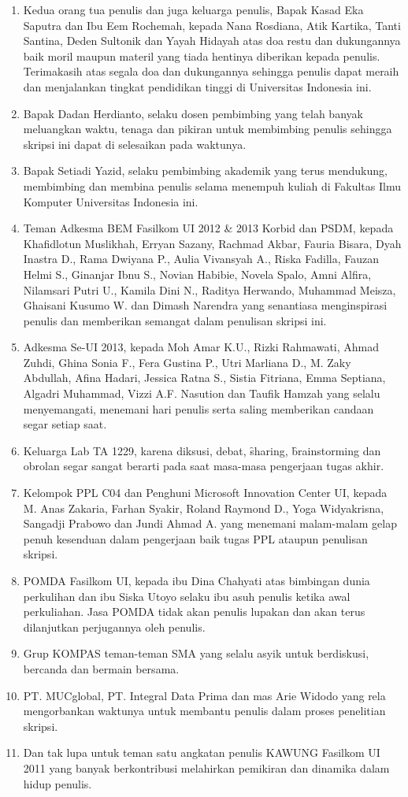 \begin{enumerate}
	\item Kedua orang tua penulis dan juga keluarga penulis, Bapak Kasad Eka Saputra dan Ibu Eem Rochemah, kepada Nana Rosdiana, Atik Kartika, Tanti Santina, Deden Sultonik dan Yayah Hidayah atas doa restu dan dukungannya baik moril maupun materil yang tiada hentinya diberikan kepada penulis. Terimakasih atas segala doa dan dukungannya sehingga penulis dapat meraih dan menjalankan tingkat pendidikan tinggi di Universitas Indonesia ini.
	\item Bapak Dadan Herdianto, selaku dosen pembimbing yang telah banyak meluangkan waktu, tenaga dan pikiran untuk membimbing penulis sehingga skripsi ini dapat di selesaikan pada waktunya.
	\item Bapak Setiadi Yazid, selaku pembimbing akademik yang terus mendukung, membimbing dan membina penulis selama menempuh kuliah di Fakultas Ilmu Komputer Universitas Indonesia ini.
	\item Teman Adkesma BEM Fasilkom UI 2012 \& 2013 Korbid dan PSDM, kepada Khafidlotun Muslikhah, Erryan Sazany, Rachmad Akbar, Fauria Bisara, Dyah Inastra D., Rama Dwiyana P., Aulia Vivansyah A., Riska Fadilla, Fauzan Helmi S., Ginanjar Ibnu S., Novian Habibie, Novela Spalo, Amni Alfira, Nilamsari Putri U., Kamila Dini N., Raditya Herwando, Muhammad Meisza, Ghaisani Kusumo W. dan Dimash Narendra yang senantiasa menginspirasi penulis dan memberikan semangat dalam penulisan skripsi ini.
	\item Adkesma Se-UI 2013, kepada Moh Amar K.U., Rizki Rahmawati, Ahmad Zuhdi, Ghina Sonia F., Fera Gustina P., Utri Marliana D., M. Zaky Abdullah, Afina Hadari, Jessica Ratna S., Sistia Fitriana, Emma Septiana, Algadri Muhammad, Vizzi A.F. Nasution dan Taufik Hamzah yang selalu menyemangati, menemani hari penulis serta saling memberikan candaan segar setiap saat.
	\item Keluarga Lab TA 1229, karena diksusi, debat, \f{sharing}, \f{brainstorming} dan obrolan segar sangat berarti pada saat masa-masa pengerjaan tugas akhir.
	\item Kelompok PPL C04 dan Penghuni Microsoft Innovation Center UI, kepada M. Anas Zakaria, Farhan Syakir, Roland Raymond D., Yoga Widyakrisna, Sangadji Prabowo dan Jundi Ahmad A. yang menemani malam-malam gelap penuh kesenduan dalam pengerjaan baik tugas PPL ataupun penulisan skripsi.
	\item POMDA Fasilkom UI, kepada ibu Dina Chahyati atas bimbingan dunia perkulihan dan ibu Siska Utoyo selaku ibu asuh penulis ketika awal perkuliahan. Jasa POMDA tidak akan penulis lupakan dan akan terus dilanjutkan perjugannya oleh penulis.
	\item Grup KOMPAS teman-teman SMA yang selalu asyik untuk berdiskusi, bercanda dan bermain bersama.
	\item PT. MUCglobal, PT. Integral Data Prima dan mas Arie Widodo yang rela mengorbankan waktunya untuk membantu penulis dalam proses penelitian skripsi.
	\item Dan tak lupa untuk teman satu angkatan penulis KAWUNG Fasilkom UI 2011 yang banyak berkontribusi melahirkan pemikiran dan dinamika dalam hidup penulis.
\end{enumerate}
